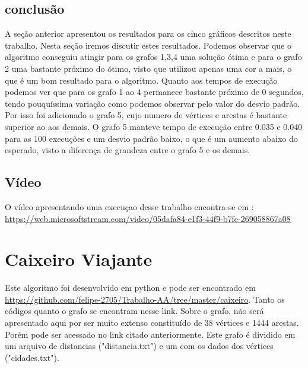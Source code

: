 \documentclass[12pt,openright,oneside,a4paper,brazil]{abntex2}
\begin{document}
\section{conclusão}
A seção anterior apresentou os resultados para os cinco gráficos descritos neste trabalho. Nesta seção iremos discutir estes resultados. Podemos observar que o algoritmo conseguiu atingir para os grafos 1,3,4 uma solução ótima e para o grafo 2 uma  bastante próximo do ótimo, visto que utilizou apenas uma cor a mais, o que é um bom resultado para o algoritmo. 
Quanto aos tempos de execução podemos ver que para os grafo 1 ao 4 permanece bastante próximo de 0 segundos, tendo pouquíssima variação como podemos observar pelo valor do desvio padrão. Por isso foi adicionado o grafo 5, cujo numero de vértices e arestas é bastante superior ao aos demais. O grafo 5 manteve tempo de execução entre 0.035 e 0.040 para as 100 execuções e um desvio padrão baixo, o que é um aumento abaixo do esperado, visto a diferença de grandeza entre o grafo 5 e os demais.

\section{Vídeo}
O vídeo apresentando uma execuçao desse trabalho encontra-se em : \url{https://web.microsoftstream.com/video/05dafa84-e1f3-44f9-b7fe-269058867a08}

\chapter{Caixeiro Viajante} 

Este algoritmo foi desenvolvido em python e pode ser encontrado em \url{https://github.com/felipe-2705/Trabalho-AA/tree/master/caixeiro}. Tanto os códigos quanto o grafo se encontram nesse link. 
Sobre o grafo, não será apresentado aqui por ser muito extenso constituído de 38 vértices e 1444 arestas. Porém pode ser acessado no link citado anteriormente. Este grafo é dividido em um arquivo de distancias ("distancia.txt") e um com os dados dos vértices ("cidades.txt").  
\end{document}
